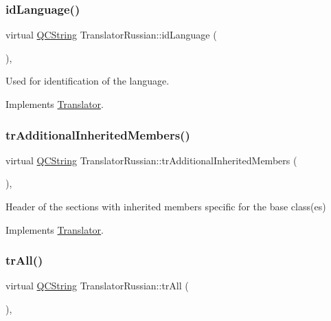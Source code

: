 \subsubsection{\texorpdfstring{idLanguage()}{idLanguage()}}
{\footnotesize\ttfamily virtual \mbox{\hyperlink{class_q_c_string}{Q\+C\+String}} Translator\+Russian\+::id\+Language (\begin{DoxyParamCaption}{ }\end{DoxyParamCaption})\hspace{0.3cm}{\ttfamily [inline]}, {\ttfamily [virtual]}}

Used for identification of the language. 

Implements \mbox{\hyperlink{class_translator}{Translator}}.

\mbox{\label{class_translator_russian_afe8e116364155ac1032da6926ac11c40}} 
\subsubsection{\texorpdfstring{trAdditionalInheritedMembers()}{trAdditionalInheritedMembers()}}
{\footnotesize\ttfamily virtual \mbox{\hyperlink{class_q_c_string}{Q\+C\+String}} Translator\+Russian\+::tr\+Additional\+Inherited\+Members (\begin{DoxyParamCaption}{ }\end{DoxyParamCaption})\hspace{0.3cm}{\ttfamily [inline]}, {\ttfamily [virtual]}}

Header of the sections with inherited members specific for the base class(es) 

Implements \mbox{\hyperlink{class_translator}{Translator}}.

\mbox{\label{class_translator_russian_a87847b557ae6ce7a51de9bfb2003fed1}} 
\subsubsection{\texorpdfstring{trAll()}{trAll()}}
{\footnotesize\ttfamily virtual \mbox{\hyperlink{class_q_c_string}{Q\+C\+String}} Translator\+Russian\+::tr\+All (\begin{DoxyParamCaption}{ }\end{DoxyParamCaption})\hspace{0.3cm}{\ttfamily [inline]}, {\ttfamily [virtual]}}

